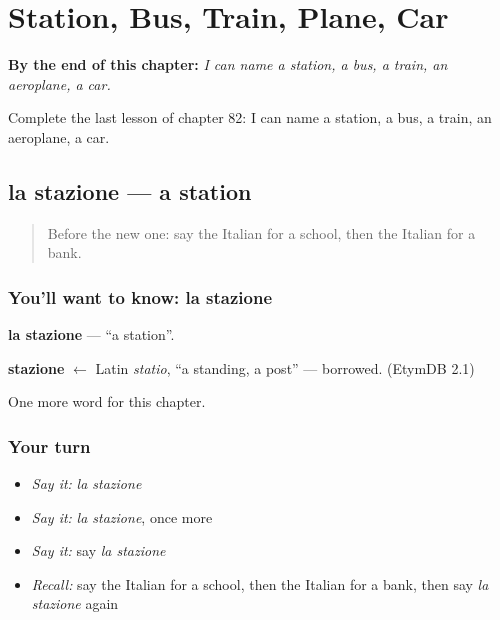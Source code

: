 
\chapter{Station, Bus, Train, Plane, Car}
\label{ch:it-station-bus-train-plane-car}

\begin{chapteropening}
\textbf{By the end of this chapter:} \emph{I can name a station, a bus, a train, an aeroplane, a car.}

Complete the last lesson of chapter 82: I can name a station, a bus, a train, an aeroplane, a car.
\end{chapteropening}

\section[la stazione]{la stazione — a station}

\label{lesson:IT-C82-stazione}



\begin{quote}
Before the new one: say the Italian for a school, then the Italian for a bank.
\end{quote}

\subsection*{You'll want to know: la stazione}
\textbf{la stazione} — \textquotedblleft{}a station\textquotedblright{}.

\begin{cousinweb}
\textbf{stazione} $\leftarrow$ Latin \emph{statio}, \textquotedblleft{}a standing, a post\textquotedblright{} — borrowed. (EtymDB 2.1)
\end{cousinweb}

\begin{grammarlens}[title={What you've built}]
One more word for this chapter.
\end{grammarlens}

\subsection*{Your turn}
\begin{itemize}
\raggedright
  \item \emph{Say it:} \emph{la stazione}
  \item \emph{Say it:} \emph{la stazione}, once more
  \item \emph{Say it:} say \emph{la stazione}
  \item \emph{Recall:} say the Italian for a school, then the Italian for a bank, then say \emph{la stazione} again
\end{itemize}

